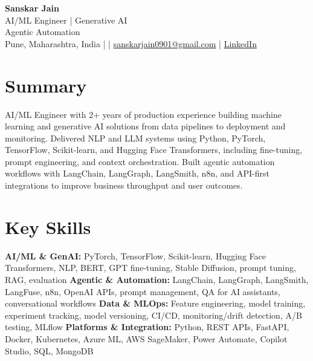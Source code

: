 \documentclass[10pt,letterpaper]{article}
\begin{document}
\begin{center}
    {\Large \textbf{Sanskar Jain}} \\
    AI/ML Engineer | Generative AI \\ Agentic Automation \\
    Pune, Maharashtra, India \enspace |  \enspace | \enspace
    \href{mailto:sanskarjain0901@gmail.com}{sanskarjain0901@gmail.com} \enspace | \enspace
    \href{https://www.linkedin.com/in/sanskar-jain0901/}{LinkedIn}
\end{center}

\section*{Summary}
AI/ML Engineer with 2+ years of production experience building machine learning and generative AI solutions from data pipelines to deployment and monitoring. Delivered NLP and LLM systems using Python, PyTorch, TensorFlow, Scikit-learn, and Hugging Face Transformers, including fine-tuning, prompt engineering, and context orchestration. Built agentic automation workflows with LangChain, LangGraph, LangSmith, n8n, and API-first integrations to improve business throughput and user outcomes.

\section*{Key Skills}
\textbf{AI/ML \& GenAI:} PyTorch, TensorFlow, Scikit-learn, Hugging Face Transformers, NLP, BERT, GPT fine-tuning, Stable Diffusion, prompt tuning, RAG, evaluation \newline
\textbf{Agentic \& Automation:} LangChain, LangGraph, LangSmith, LangFuse, n8n, OpenAI APIs, prompt management, QA for AI assistants, conversational workflows \newline
\textbf{Data \& MLOps:} Feature engineering, model training, experiment tracking, model versioning, CI/CD, monitoring/drift detection, A/B testing, MLflow \newline
\textbf{Platforms \& Integration:} Python, REST APIs, FastAPI, Docker, Kubernetes, Azure ML, AWS SageMaker, Power Automate, Copilot Studio, SQL, MongoDB
\end{document}
